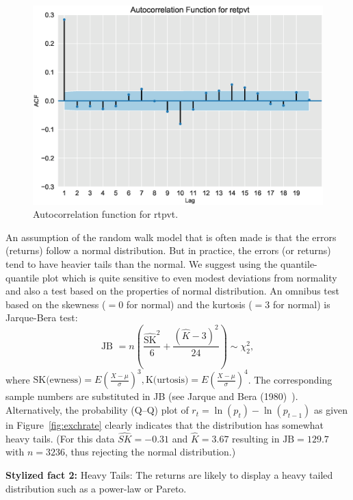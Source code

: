	\begin{figure}[!ht]
	\centering
	\includegraphics[width=\textwidth]{chapters/chapter_uvts/figures/Sec2-4Fig5.eps}
	\caption{Autocorrelation function for rtpvt. \label{fig:autocorrtpvt}}
	\end{figure}
An assumption of the random walk model that is often made is that the errors (returns)
follow a normal distribution. But in practice, the errors (or returns) tend to have heavier tails than the normal. We suggest using the quantile-quantile plot which is quite sensitive to even modest deviations from normality and also a test based on the properties of normal distribution. An omnibus test based on the skewness ($=0$ for normal) and the kurtosis ($=3$ for normal) is Jarque-Bera test:
	\begin{equation} \label{eqn:2JB}
	\text{JB }= n \left( \frac{\widehat{\text{SK}}^2}{6} + \frac{(\hat{K} - 3)^2}{24} \right) \sim \chi_2^2,
	\end{equation}
where $\text{SK} \text{(ewness)}= E( \frac{X-\mu}{\sigma} )^3, \text{K} \text{(urtosis)} = E( \frac{X-\mu}{\sigma} )^4$. The corresponding sample numbers are substituted in JB (see Jarque and Bera (1980)~\cite{jarque80}). Alternatively, the probability (Q--Q) plot of $r_t = \ln{(p_t)} - \ln{(p_{t-1})}$ as given in Figure~\ref{fig:exchrate} clearly indicates that the distribution has somewhat heavy tails. (For this data $\widehat{SK} = -0.31$ and $\hat{K} = 3.67$ resulting in $\text{JB}= 129.7$ with $n= 3236$, thus rejecting the normal distribution.) \twomedskip


\noindent\textbf{Stylized fact 2:} Heavy Tails: The returns are likely to display a heavy
tailed distribution such as a power-law or Pareto. \twomedskip


